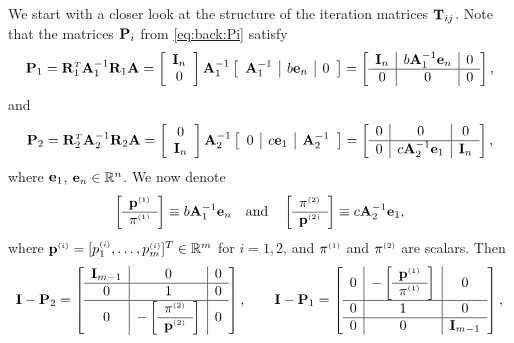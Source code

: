 We start with a closer look at the structure of the iteration matrices
$\T_{ij}$. Note that the matrices $\P_i$ from \eqref{eq:back:Pi} satisfy
%
\begin{equation}\label{eq:1D:P1struct}
\P_1 = \R_1^{\Tr}\A_1^{-1}\R_1\A
=\left[\begin{array}{c} \I_{n}\\ 0\end{array}\right]\A_1^{-1}
\left[\begin{array}{c|c|c}\A_1^{-1} & \entryzE \e_n & 0\end{array}\right]=
\left[\begin{array}{c|c|c}\I_{n}&\entryzE \A_1^{-1}\e_{n}&0\\\hline 0&0&0\end{array}\right],
\end{equation}
%
and
%
\begin{equation}\label{eq:1D:P2struct}
\P_2 = \R_2^{\Tr}\A_2^{-1}\R_2\A =
\left[\begin{array}{c} 0 \\  \I_n\end{array}\right] \A_2^{-1}
\left[\begin{array}{c|c|c}0 & \entryzW \e_1 & \A_2^{-1} \end{array}\right]=
\left[\begin{array}{c|c|c}0&0&0\\\hline0&\entryzW \A_2^{-1}\e_1 & \I_{n}\end{array}\right],
\end{equation}
%
where $\e_1$, $\e_n\in \mathbb{R}^n$. We now denote
%
\begin{equation}\label{eq:1D:p_and_pi}
\left[\begin{array}{c}\pOne \\\hline \piOne\end{array}\right]
\equiv \entryzE\A_1^{-1}\e_n\quad\mbox{and}\quad
\left[\begin{array}{c} \piTwo\\\hline \pTwo\end{array}\right]
\equiv \entryzW\A_2^{-1}\e_1,
\end{equation}
%
where $\pII=[\pI_1,\dots,\pI_m]^T\in{\mathbb R}^m$ for $i=1,2$, and $\piOne$
and $\piTwo$ are scalars. Then
%
$$\I - \P_2  =
\left[\begin{array}{c|c|c}\I_{m-1}&0&0\\\hline
0&1&0\\\hline 0&-\left[\begin{array}{c} \piTwo\\\hline \pTwo\end{array}\right]&0\end{array}\right],\qquad
\I - \P_1  =
\left[\begin{array}{c|c|c}0&-\left[\begin{array}{c}\pOne \\\hline \piOne\end{array}\right]&0\\\hline 0&1&0\\\hline 0&0&\I_{m-1}\end{array}\right],$$
